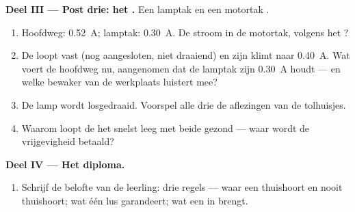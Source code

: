 \begin{problem}
\medskip\noindent\textbf{Deel III --- Post drie: het
.}
Een lamptak en een motortak
.
\begin{enumerate}[resume]
  \item Hoofdweg: \qty{0.52}{A}; lamptak: \qty{0.30}{A}. De
        stroom in de motortak, volgens het ?
  \item De  loopt vast (nog aangesloten, niet draaiend) en
        zijn  klimt naar \qty{0.40}{A}. Wat voert de
        hoofdweg nu, aangenomen dat de lamptak zijn
        \qty{0.30}{A} houdt --- en welke bewaker van de werkplaats
        luistert mee?
  \item De lamp wordt losgedraaid. Voorspel alle drie de aflezingen
        van de tolhuisjes.
  \item Waarom loopt de  het snelst leeg met beide
         gezond --- waar wordt de vrijgevigheid betaald?
\end{enumerate}

\medskip\noindent\textbf{Deel IV --- Het diploma.}
\begin{enumerate}[resume]
  \item Schrijf de belofte van de leerling: drie regels --- waar een
         thuishoort en nooit thuishoort; wat één lus
        garandeert; wat een  in  brengt.
\end{enumerate}
\end{problem}

